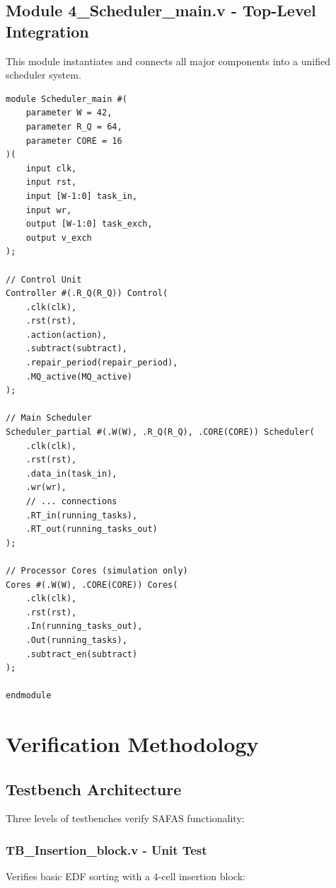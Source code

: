 \documentclass[12pt,a4paper]{article}
\begin{document}
\subsection{Module 4\_Scheduler\_main.v - Top-Level Integration}

This module instantiates and connects all major components into a unified scheduler system.

\begin{lstlisting}[style=verilog, caption={Top-Level Module Instantiation}]
module Scheduler_main #(
    parameter W = 42,
    parameter R_Q = 64,
    parameter CORE = 16
)(
    input clk,
    input rst,
    input [W-1:0] task_in,
    input wr,
    output [W-1:0] task_exch,
    output v_exch
);

// Control Unit
Controller #(.R_Q(R_Q)) Control(
    .clk(clk),
    .rst(rst),
    .action(action),
    .subtract(subtract),
    .repair_period(repair_period),
    .MQ_active(MQ_active)
);

// Main Scheduler
Scheduler_partial #(.W(W), .R_Q(R_Q), .CORE(CORE)) Scheduler(
    .clk(clk),
    .rst(rst),
    .data_in(task_in),
    .wr(wr),
    // ... connections
    .RT_in(running_tasks),
    .RT_out(running_tasks_out)
);

// Processor Cores (simulation only)
Cores #(.W(W), .CORE(CORE)) Cores(
    .clk(clk),
    .rst(rst),
    .In(running_tasks_out),
    .Out(running_tasks),
    .subtract_en(subtract)
);

endmodule
\end{lstlisting}

\section{Verification Methodology}

\subsection{Testbench Architecture}

Three levels of testbenches verify SAFAS functionality:

\subsubsection{TB\_Insertion\_block.v - Unit Test}

Verifies basic EDF sorting with a 4-cell insertion block:
\end{document}
